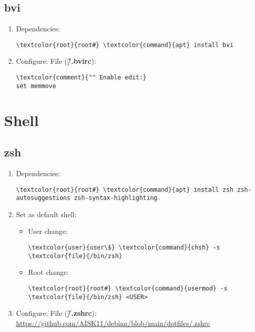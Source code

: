 \documentclass[10pt, a4paper, onecolumn, openany]{book} %
\begin{document}
\subsection{bvi}
\begin{enumerate}
    \item Dependencies:
\begin{Verbatim}[commandchars=\\\{\}]
\textcolor{root}{root#} \textcolor{command}{apt} install bvi
\end{Verbatim}
    \item Configure:
\newline File (\textbf{\textcolor{file}{\~/.bvirc}}):
\begin{Verbatim}[commandchars=\\\{\}]
\textcolor{comment}{"" Enable edit:}
set memmove
\end{Verbatim}
\end{enumerate}
\section{Shell}
\subsection{zsh}
\begin{enumerate}
    \item Dependencies:
\begin{Verbatim}[commandchars=\\\{\}]
\textcolor{root}{root#} \textcolor{command}{apt} install zsh zsh-autosuggestions zsh-syntax-highlighting
\end{Verbatim}
    \item Set as default shell:
    \begin{itemize}
        \item User change:
\begin{Verbatim}[commandchars=\\\{\}]
\textcolor{user}{user\$} \textcolor{command}{chsh} -s \textcolor{file}{/bin/zsh}
\end{Verbatim}
        \item Root change:
\begin{Verbatim}[commandchars=\\\{\}]
\textcolor{root}{root#} \textcolor{command}{usermod} -s \textcolor{file}{/bin/zsh} <USER>
\end{Verbatim}
    \end{itemize}
    \item Configure:
\newline File (\textbf{\textcolor{file}{\~/.zshrc}}):
\newline \underline{\url{https://github.com/AISK11/debian/blob/main/dotfiles/.zshrc}}
\end{enumerate}
\end{document}
